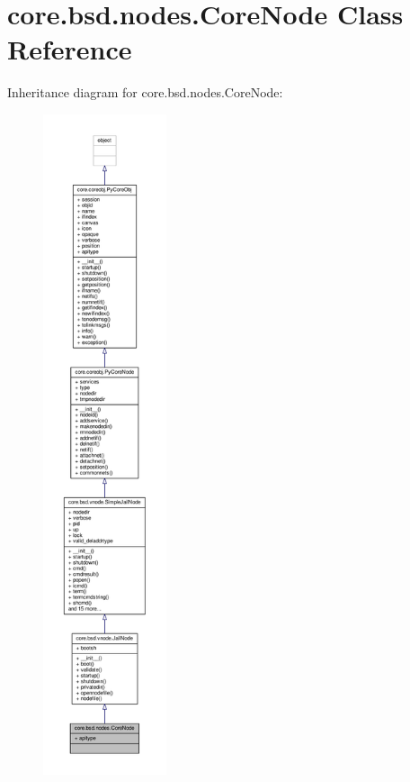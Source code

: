 \hypertarget{classcore_1_1bsd_1_1nodes_1_1_core_node}{\section{core.\+bsd.\+nodes.\+Core\+Node Class Reference}
\label{classcore_1_1bsd_1_1nodes_1_1_core_node}
}


Inheritance diagram for core.\+bsd.\+nodes.\+Core\+Node\+:
\nopagebreak
\begin{figure}[H]
\begin{center}
\leavevmode
\includegraphics[height=550pt]{classcore_1_1bsd_1_1nodes_1_1_core_node__inherit__graph}
\end{center}
\end{figure}


